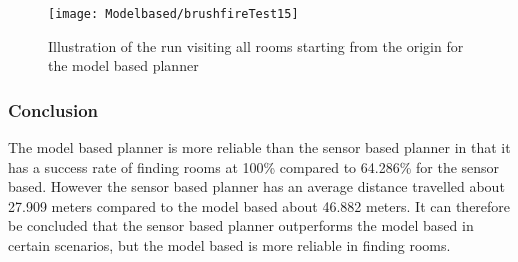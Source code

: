 \documentclass[../Head/Main.tex]{subfiles}
\begin{document}





\begin{figure}[H]
	\centering
	\texttt{[image: Modelbased/brushfireTest15]}
	\caption{Illustration of the run visiting all rooms starting from the origin for the model based planner}
	\label{fig:Test15}
\end{figure}

\subsubsection{Conclusion}

The model based planner is more reliable than the sensor based planner in that it has a success rate of finding rooms at 100\% compared to 64.286\% for the sensor based. However the sensor based planner has an average distance travelled about 27.909 meters compared to the model based about 46.882 meters. It can therefore be concluded that the sensor based planner outperforms the model based in certain scenarios, but the model based is more reliable in finding rooms. 
\end{document}
